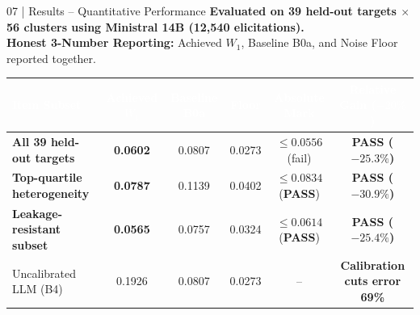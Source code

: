 \documentclass[10pt,aspectratio=169]{beamer}
\begin{document}
\begin{frame}{07 | Results -- Quantitative Performance}
    \scriptsize
    \textbf{Evaluated on 39 held-out targets $\times$ 56 clusters using Ministral 14B (12,540 elicitations).} \\
    \textbf{Honest 3-Number Reporting:} Achieved $W_1$, Baseline B0a, and Noise Floor reported together.
    \vspace{0.1cm}

    \renewcommand{\arraystretch}{1.18}
    \begin{table}
    \begin{tabularx}{\textwidth}{@{} >{\raggedright\arraybackslash}X c c c c c @{}}
        \toprule
        \rowcolor{HeaderNavy}
        \textcolor{white}{\textbf{Item Subset}} & \textcolor{white}{\textbf{Achieved $W_1$}} & \textcolor{white}{\textbf{Baseline B0a}} & \textcolor{white}{\textbf{Floor}} & \textcolor{white}{\textbf{Absolute Mark}} & \textcolor{white}{\textbf{Relative Gain ($-20\%$)}} \\
        \midrule
        \rowcolor{RowAlt} \textbf{All 39 held-out targets} & \textbf{0.0602} & 0.0807 & 0.0273 & $\le 0.0556$ (fail) & {\color{TLGreen}\textbf{PASS ($-25.3\%$)}} \\
        \textbf{Top-quartile heterogeneity} & \textbf{0.0787} & 0.1139 & 0.0402 & $\le 0.0834$ ({\color{TLGreen}\textbf{PASS}}) & {\color{TLGreen}\textbf{PASS ($-30.9\%$)}} \\
        \rowcolor{RowAlt} \textbf{Leakage-resistant subset} & \textbf{0.0565} & 0.0757 & 0.0324 & $\le 0.0614$ ({\color{TLGreen}\textbf{PASS}}) & {\color{TLGreen}\textbf{PASS ($-25.4\%$)}} \\
        Uncalibrated LLM (B4) & 0.1926 & 0.0807 & 0.0273 & -- & \textbf{Calibration cuts error 69\%} \\
        \bottomrule
    \end{tabularx}
    \end{table}


\end{frame}
\end{document}
